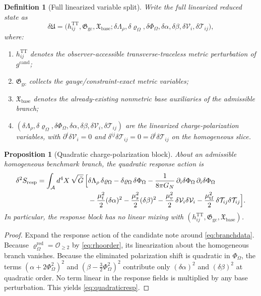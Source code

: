 \documentclass[11pt]{article}
\newcommand{\Sub}{\mathcal A}
\newcommand{\CandidateMetric}{g^{\mathrm{cand}}}
\newcommand{\FlowPot}{\Phi_\Omega}
\newcommand{\SourceDensity}{\varrho_\Omega}
\newcommand{\SourceDensityRed}{\varrho_\Omega^{\mathrm{red}}}
\newcommand{\SourceMult}{\Lambda_\rho}
\newcommand{\BaseAux}{\mathfrak X_{\mathrm{base}}}
\newcommand{\GaugeAux}{\mathfrak G_{\mathrm{gc}}}
\newcommand{\RespAct}{S_{\mathrm{resp}}}
\newcommand{\TT}{\mathrm{TT}}
\newtheorem{definition}{Definition}
\newtheorem{proposition}{Proposition}
\begin{document}
\begin{definition}[Full linearized variable split]
\label{def:split}
Write the full linearized reduced state as
\begin{equation}
\delta\mathfrak U
=
\bigl(h^{\TT}_{ij},\GaugeAux,\BaseAux;
\delta\SourceMult,\delta\SourceDensity,\delta\FlowPot,
\delta\alpha,\delta\beta,\delta\mathcal V_i,\delta\mathcal T_{ij}\bigr),
\label{eq:split}
\end{equation}
where:
\begin{enumerate}
    \item \(h^{\TT}_{ij}\) denotes the observer-accessible transverse-traceless metric perturbation of \(\CandidateMetric\);
    \item \(\GaugeAux\) collects the gauge/constraint-exact metric variables;
    \item \(\BaseAux\) denotes the already-existing nonmetric base auxiliaries of the admissible branch;
    \item \((\delta\SourceMult,\delta\SourceDensity,\delta\FlowPot,\delta\alpha,\delta\beta,\delta\mathcal V_i,\delta\mathcal T_{ij})\) are the linearized charge-polarization variables, with \(\partial^i\delta\mathcal V_i=0\) and \(\delta^{ij}\delta\mathcal T_{ij}=0=\partial^i\delta\mathcal T_{ij}\) on the homogeneous slice.
\end{enumerate}
\end{definition}

\begin{proposition}[Quadratic charge-polarization block]
\label{prop:quadratic}
About an admissible homogeneous benchmark branch, the quadratic response action is
\begin{align}
\delta^2\RespAct
=
\int_{\Sub} d^4X\,\sqrt{\bar G}\,
\Bigl[
&\delta\SourceMult\,\delta\SourceDensity
-\delta\SourceDensity\,\delta\FlowPot
-\frac{1}{8\pi G_N}\,\partial_i\delta\FlowPot\,\partial_i\delta\FlowPot
\nonumber\\
&-\frac{\mu_t^2}{2}(\delta\alpha)^2
-\frac{\mu_s^2}{2}(\delta\beta)^2
-\frac{\mu_v^2}{2}\,\delta\mathcal V_i\delta\mathcal V_i
-\frac{\mu_{\mathrm{tf}}^2}{2}\,\delta\mathcal T_{ij}\delta\mathcal T_{ij}
\Bigr].
\label{eq:quadraticresp}
\end{align}
In particular, the response block has no linear mixing with \((h^{\TT}_{ij},\GaugeAux,\BaseAux)\).
\end{proposition}

\begin{proof}
Expand the response action of the candidate note around \eqref{eq:branchdata}. Because \(\SourceDensityRed=\mathcal O_{\ge 2}\) by \eqref{eq:rhoorder}, its linearization about the homogeneous branch vanishes. Because the eliminated polarization shift is quadratic in \(\FlowPot\), the terms \((\alpha+2\FlowPot^2)^2\) and \((\beta-\tfrac32\FlowPot^2)^2\) contribute only \((\delta\alpha)^2\) and \((\delta\beta)^2\) at quadratic order. No term linear in the response fields is multiplied by any base perturbation. This yields \eqref{eq:quadraticresp}.
\end{proof}
\end{document}
